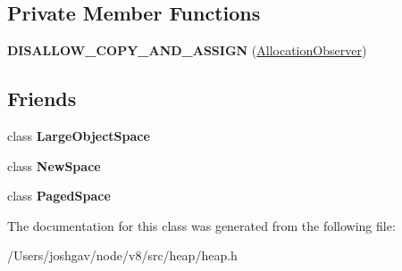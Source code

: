 \subsection*{Private Member Functions}
\begin{DoxyCompactItemize}
\item 
{\bfseries D\+I\+S\+A\+L\+L\+O\+W\+\_\+\+C\+O\+P\+Y\+\_\+\+A\+N\+D\+\_\+\+A\+S\+S\+I\+GN} (\hyperlink{classv8_1_1internal_1_1_allocation_observer}{Allocation\+Observer})\hypertarget{classv8_1_1internal_1_1_allocation_observer_a8e27676bc76f2081c8c6920f873e3f3c}{}\label{classv8_1_1internal_1_1_allocation_observer_a8e27676bc76f2081c8c6920f873e3f3c}

\end{DoxyCompactItemize}
\subsection*{Friends}
\begin{DoxyCompactItemize}
\item 
class {\bfseries Large\+Object\+Space}\hypertarget{classv8_1_1internal_1_1_allocation_observer_ae7bd71eb9e957e0b89a7d3a76836d4b3}{}\label{classv8_1_1internal_1_1_allocation_observer_ae7bd71eb9e957e0b89a7d3a76836d4b3}

\item 
class {\bfseries New\+Space}\hypertarget{classv8_1_1internal_1_1_allocation_observer_a71065109e762b07b59b80cd64d885ff8}{}\label{classv8_1_1internal_1_1_allocation_observer_a71065109e762b07b59b80cd64d885ff8}

\item 
class {\bfseries Paged\+Space}\hypertarget{classv8_1_1internal_1_1_allocation_observer_a57d18a423c610563132a99ab1e1c1b8e}{}\label{classv8_1_1internal_1_1_allocation_observer_a57d18a423c610563132a99ab1e1c1b8e}

\end{DoxyCompactItemize}


The documentation for this class was generated from the following file\+:\begin{DoxyCompactItemize}
\item 
/\+Users/joshgav/node/v8/src/heap/heap.\+h\end{DoxyCompactItemize}

